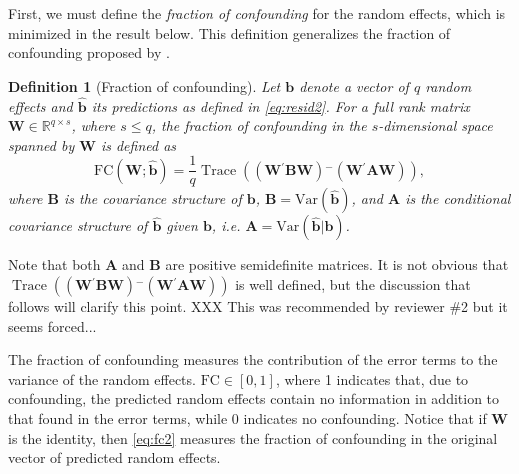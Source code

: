 \documentclass[12pt]{article} %
\newtheorem{definition}{Definition}
\newcommand{\ginv}{\ensuremath{^{-}}}
\newcommand{\trans}{\ensuremath{^\prime}}
\newcommand{\var}{\ensuremath{\mathrm{Var}}}
\DeclareMathOperator{\tr}{Trace}
\begin{document}
{First, we must define the \emph{fraction of confounding} for the random effects, which is minimized in the result below. This definition generalizes the fraction of confounding proposed by \cite{HildenMinton:1995wh}. 
\begin{definition}[Fraction of confounding] 
Let $\bm{b}$ denote a vector of $q$ random effects and $\widehat{\bm{b}}$ its predictions as defined in \eqref{eq:resid2}. For a full rank matrix $\bm{W} \in \mathbb{R}^{q \times s}$, where $ s \le q$, the fraction of confounding in the $s$-dimensional space spanned by $\bm{W}$ is defined as 
\begin{equation}\label{eq:fc2}
\text{FC}(\bm{W}; \widehat{\bm{b}}) = \frac{1}{q} \tr\left( \left(\bm{W\trans B W} \right)\ginv \left(\bm{W\trans A W}\right) \right),
\end{equation}
where $\bm{B}$ is the covariance structure of $\bm b$, $\bm{B} = \var(\widehat{\bm{b}})$, and $\bm{A}$ is the conditional covariance structure of  $\widehat{\bm{b}}$ given $\bm{b}$,  i.e. $\bm{A} = \var(\widehat{\bm{b}} | \bm{b} )$.
\end{definition}
\noindent
Note that both $\bm{A}$ and $\bm{B}$ are  positive semidefinite matrices. It is not obvious that $\tr\left( \left(\bm{W\trans B W} \right)\ginv \left(\bm{W\trans A W}\right) \right)$ is well defined, but the discussion that follows will clarify this point. XXX This was recommended by reviewer \#2 but it seems forced...


The fraction of confounding measures the contribution of the error terms  to the variance of the random effects. $\text{FC} \in [0,1]$, where 1 indicates that, due to confounding, the predicted random effects contain no information in addition to that found in the error terms, while 0 indicates no confounding. Notice that if $\bm{W}$ is the identity, then \eqref{eq:fc2} measures the fraction of confounding in the original vector of predicted random effects.


%


}
\end{document}
